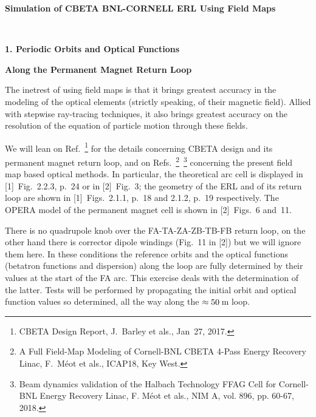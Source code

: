 \documentclass[10pt]{article}
\begin{document}
\thispagestyle{empty}

\begin{minipage}{1.\linewidth}
\bf
\vspace{-2ex}
  
\vspace{-2ex}
  
\vspace{-2ex}
  
\end{minipage}


\vspace{5ex}

\centerline{\LARGE \bf
  Simulation of CBETA BNL-CORNELL ERL Using Field Maps
}

~

\centerline{\LARGE \bf
1. Periodic Orbits and Optical Functions 
}

\centerline{\LARGE \bf
  Along the Permanent Magnet Return Loop
}

\vspace{5ex}
\author{
F.~M\'eot
\\
Collider-Accelerator Department, BNL, Upton, NY 11973 \\
}


The inetrest of using field maps is that it brings greatest accuracy in the modeling of the optical elements (strictly speaking,
of their magnetic field). Allied with stepwise ray-tracing techniques, it also brings greatest accuracy on
the resolution of the equation of particle motion through these fields. 

We will lean on Ref.~\footnote{CBETA Design Report, J.~Barley et als., Jan~27, 2017.} 
for the details concerning CBETA design and its permanent magnet return loop, 
and on Refs.~\footnote{A Full Field-Map Modeling of Cornell-BNL CBETA 4-Pass Energy Recovery Linac, F.~M\'eot et als., ICAP18, Key West.}~\footnote{Beam dynamics validation of the Halbach Technology FFAG Cell for Cornell-BNL Energy Recovery Linac, F. Méot et als., NIM A, vol. 896, pp. 60-67, 2018.} concerning the present field map based optical methods. 
In particular, the theoretical arc cell is displayed in [1]~Fig.~2.2.3, p.~24 or in [2]~Fig.~3; the geometry of the ERL and of its return loop are shown in [1]~Figs.~2.1.1, p.~18 and 2.1.2, p.~19 respectively. The OPERA model of the permanent magnet cell is shown in [2]~Figs.~6 and~11.

There is no quadrupole knob over the FA-TA-ZA-ZB-TB-FB return loop, on the other hand there is corrector dipole windings
(Fig.~11 in [2]) but we will ignore them here. 
In these conditions the reference orbits and the optical functions (betatron functions and dispersion)
along the loop are fully determined by their values at the start of the FA arc.
This exercise deals with the determination of the latter.
Tests will be performed by propagating the initial orbit and optical function values so determined, 
all the way along the $\rm \approx 50$\,m loop.
\end{document}
